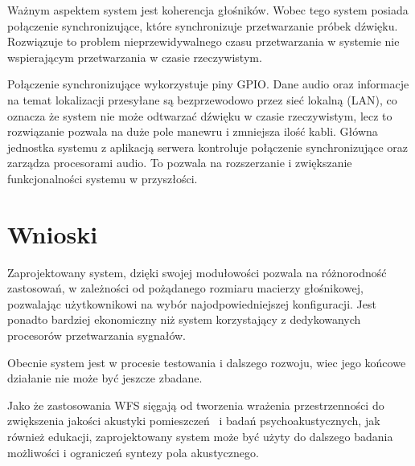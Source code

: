 \documentclass[12pt]{oska}
\let\Oldsection\section
\renewcommand{\section}{\FloatBarrier\Oldsection}
\begin{document}
Ważnym aspektem system jest koherencja głośników. Wobec tego system posiada
połączenie synchronizujące, które synchronizuje przetwarzanie próbek dźwięku.
Rozwiązuje to problem nieprzewidywalnego czasu przetwarzania w systemie nie
wspierającym przetwarzania w czasie rzeczywistym.

Połączenie synchronizujące wykorzystuje piny GPIO. Dane audio oraz informacje
na temat lokalizacji przesyłane są bezprzewodowo przez sieć lokalną (LAN), co
oznacza że system nie może odtwarzać dźwięku w czasie rzeczywistym, lecz to
rozwiązanie pozwala na duże pole manewru i zmniejsza ilość kabli. Główna
jednostka systemu z aplikacją serwera kontroluje połączenie synchronizujące
oraz zarządza procesorami audio. To pozwala na rozszerzanie i zwiększanie
funkcjonalności systemu w przyszłości.

\section{Wnioski}
Zaprojektowany system, dzięki swojej modułowości pozwala na różnorodność
zastosowań, w zależności od pożądanego rozmiaru macierzy głośnikowej,
pozwalając użytkownikowi na wybór najodpowiedniejszej konfiguracji. Jest
ponadto bardziej ekonomiczny niż system korzystający z dedykowanych procesorów
przetwarzania sygnałów.

Obecnie system jest w procesie testowania i dalszego rozwoju, wiec jego końcowe
działanie nie może być jeszcze zbadane.

Jako że zastosowania WFS sięgają od tworzenia wrażenia przestrzenności do
zwiększenia jakości akustyki pomieszczeń~\cite{enhancement} i badań
psychoakustycznych, jak również edukacji, zaprojektowany system może być użyty
do dalszego badania możliwości i ograniczeń syntezy pola akustycznego.

\printbibliography
\end{document}
